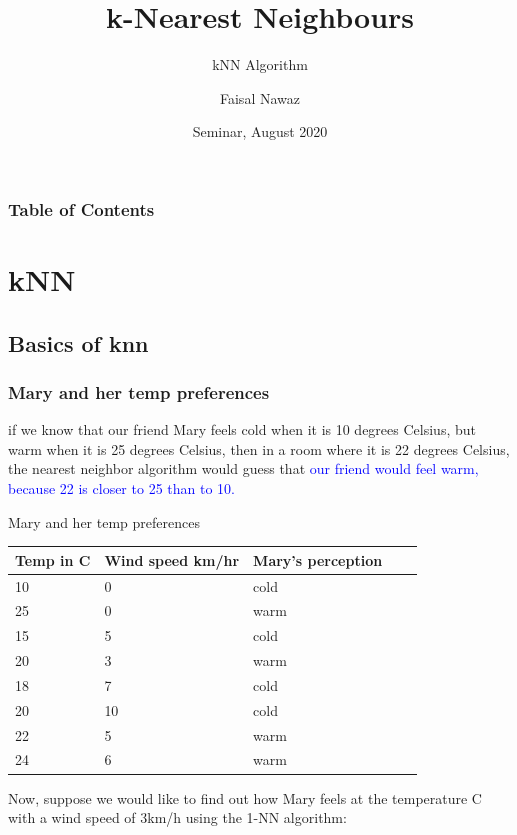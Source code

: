 \documentclass{beamer}
\title[KNN] %
{k-Nearest Neighbours}
\subtitle{kNN Algorithm}
\author[Faisal Nawaz] %
{Faisal Nawaz}
\institute[CUI] %
{
  
  Faculty of Management Sciences\\
  COMSATS University
  
}
\date[CUI 2020] %
{Seminar, August 2020}
\begin{document}
\frame{\titlepage}


\begin{frame}
\frametitle{Table of Contents}
\tableofcontents
\end{frame}


\section{kNN}
\subsection{Basics of knn}
\begin{frame}[t]
\frametitle{Mary and her temp preferences}\vspace{10pt}
if we know that our friend Mary feels cold when it is 10 degrees Celsius, but
warm when it is 25 degrees Celsius, then in a room where it is 22 degrees Celsius, the
nearest neighbor algorithm would guess that \pause \textcolor{blue}{our friend would feel warm, because 22 is
\alert{closer} to 25 than to 10.}
\end{frame}

    
\begin{frame}{Mary and her temp preferences}\vspace{10pt}
    
\begin{table}[]
\begin{tabular}{@{}lllll@{}}
\toprule
Temp in \textdegree{}C & Wind speed km/hr & Mary's perception \\ \midrule
10 & 0  & cold &  &  \\ 
25 & 0  & warm &  &  \\
15 & 5  & cold &  &  \\
20 & 3  & warm &  &  \\
18 & 7  & cold &  &  \\
20 & 10 & cold &  &  \\
22 & 5  & warm &  &  \\
24 & 6  & warm &  &  \\ \bottomrule
\end{tabular}
\end{table}
Now, suppose we would like to find out how Mary feels at the temperature C with a wind speed of 3km/h using the 1-NN algorithm:
\end{frame}
\end{document}

